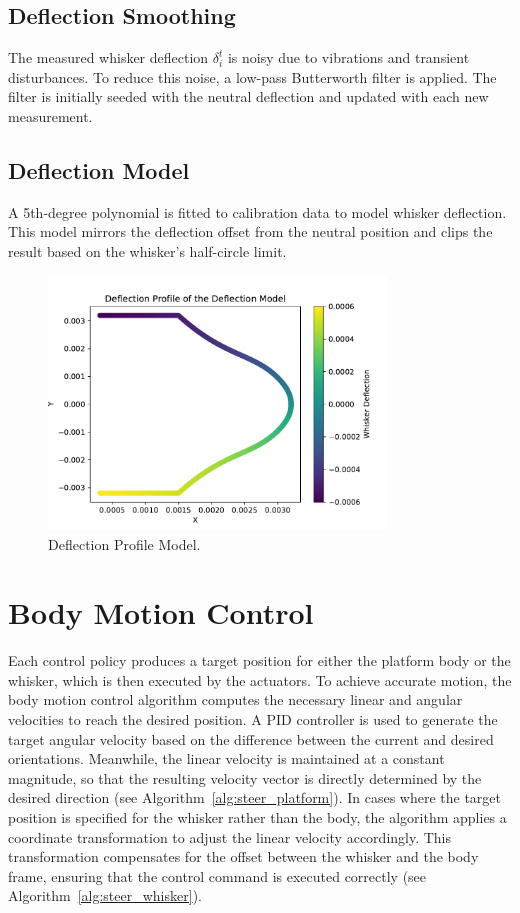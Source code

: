 \subsection{Deflection Smoothing}

The measured whisker deflection \(\delta_{i}^{t}\) is noisy due to vibrations and transient disturbances.
To reduce this noise, a low-pass Butterworth filter is applied.
The filter is initially seeded with the neutral deflection and updated with each new measurement.

\subsection{Deflection Model}

A 5th-degree polynomial is fitted to calibration data to model whisker deflection.
This model mirrors the deflection offset from the neutral position and clips the result based on the whisker's half-circle limit.

\begin{figure}[H]
    \centering
    \includegraphics[width=0.8\textwidth]{figures/deflection_profile}
    \caption{Deflection Profile Model.}
    \label{fig:deflection_profile}
\end{figure}



\section{Body Motion Control}

Each control policy produces a target position for either the platform body or the whisker, which is then executed by the actuators.
To achieve accurate motion, the body motion control algorithm computes the necessary linear and angular velocities to reach the desired position.
A PID controller is used to generate the target angular velocity based on the difference between the current and desired orientations.
Meanwhile, the linear velocity is maintained at a constant magnitude, so that the resulting velocity vector is directly determined by the desired direction (see Algorithm~\ref{alg:steer_platform}).
In cases where the target position is specified for the whisker rather than the body, the algorithm applies a coordinate transformation to adjust the linear velocity accordingly.
This transformation compensates for the offset between the whisker and the body frame, ensuring that the control command is executed correctly (see Algorithm~\ref{alg:steer_whisker}).


